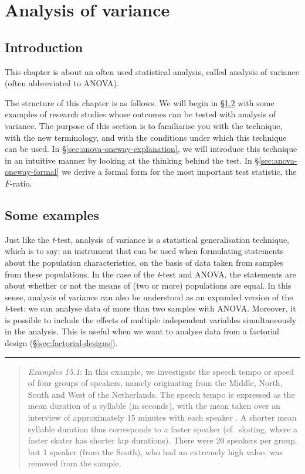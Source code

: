 \documentclass[
]{book}
\begin{document}
\chapter{Analysis of variance}\label{ch-anova}

\section{Introduction}\label{sec:introduction}

This chapter is about an often used statistical analysis, called
analysis of variance (often abbreviated to ANOVA).

The structure of this chapter is as follows. We will begin in §\ref{sec:anova-examples}
with some examples of research studies whose outcomes
can be tested with analysis of variance. The purpose of this section
is to familiarise you with the technique,
with the new terminology, and with the conditions under which this technique
can be used. In §\ref{sec:anova-oneway-explanation}, we will introduce this technique
in an intuitive manner by looking at the thinking behind the test. In
§\ref{sec:anova-oneway-formal} we derive a formal form for the most important
test statistic, the \(F\)-ratio.

\section{Some examples}\label{sec:anova-examples}

Just like the \emph{t}-test, analysis of variance is a statistical generalisation
technique, which is to say: an instrument that can be used
when formulating statements about the population characteristics,
on the basis of data taken from samples from these populations.
In the case of the \emph{t}-test and ANOVA, the statements are about
whether or not the means of (two or more) populations are equal.
In this sense, analysis of variance can also be understood as an
expanded version of the \emph{t}-test: we can analyse data
of more than two samples with ANOVA. Moreover, it is possible to include the effects
of multiple independent variables simultaneously in the analysis. This is useful
when we want to analyse data from a factorial design
(§\ref{sec:factorial-designs}).

\begin{center}\rule{0.5\linewidth}{0.5pt}\end{center}

\begin{quote}
\emph{Examples 15.1}: In this example, we investigate the speech tempo or
speed of four groups of speakers, namely originating from the Middle, North,
South and West of the Netherlands. The speech tempo is expressed as the mean
duration of a syllable (in seconds), with the mean taken over an interview of approximately
15 minutes with each speaker \citep{Quene08} \citep{R-hqmisc}.
A shorter mean syllable duration thus corresponds to a faster speaker (cf.~skating, where a faster skater has shorter lap durations). There were 20
speakers per group, but 1 speaker (from the South), who had an extremely high value,
was removed from the sample.
\end{quote}
\end{document}
